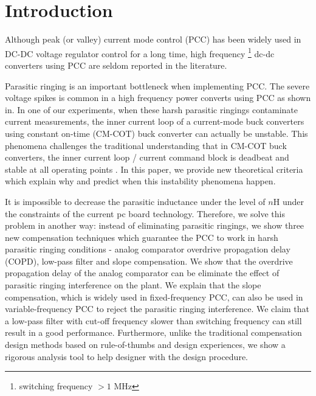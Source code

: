 \section{Introduction}\label{sec:Intro}
Although peak (or valley) current mode control (PCC) has been widely used in DC-DC voltage regulator control for a long time, high frequency \footnote{switching frequency $> 1$ MHz} dc-dc converters using PCC are seldom reported in the literature.

Parasitic ringing is an important bottleneck when implementing PCC. The severe voltage spikes is common in a high frequency power converts using PCC as shown in. In one of our experiments, when these harsh parasitic ringings contaminate current measurements, the inner current loop of a current-mode buck converters using constant on-time (CM-COT) buck converter can actually be unstable. This phenomena challenges the traditional understanding that in CM-COT buck converters, the {\color{red} inner current loop / current command block} is deadbeat and stable at all operating points \cite{Redl1981}. In this paper, we provide new theoretical criteria which explain why and predict when this instability phenomena happen.

It is impossible to decrease the parasitic inductance under the level of $n$H under the constraints of the current pc board technology. Therefore, we solve this problem in another way: instead of eliminating parasitic ringings, we show three new compensation techniques which guarantee the PCC to work in harsh parasitic ringing conditions - analog comparator overdrive propagation delay {\color{red}(COPD)}, low-pass filter and slope compensation. We show that the overdrive propagation delay of the analog comparator can be eliminate the effect of parasitic ringing interference on the plant. We explain that the slope compensation, which is widely used in fixed-frequency PCC, can also be used in variable-frequency PCC to reject the parasitic ringing interference. We claim that a low-pass filter with cut-off frequency slower than switching frequency can still result in a good performance.
Furthermore, unlike the traditional compensation design methods based on rule-of-thumbs and design experiences, we show a rigorous analysis tool to help designer with the design procedure.

